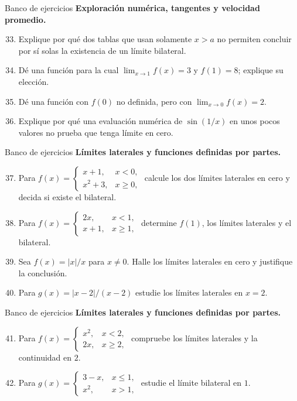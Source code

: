 \documentclass[12pt,aspectratio=169]{beamer}
\begin{document}
\begin{frame}[t,allowframebreaks]{Banco de ejercicios}
\small
\noindent \textbf{Exploración numérica, tangentes y velocidad promedio.}\par\smallskip
\begin{enumerate}\setcounter{enumi}{32}
\item Explique por qué dos tablas que usan solamente $x> a$ no permiten concluir por sí solas la existencia de un límite bilateral.
\item Dé una función para la cual $\lim_{x\to1}f(x)=3$ y $f(1)=8$; explique su elección.
\item Dé una función con $f(0)$ no definida, pero con $\lim_{x\to0}f(x)=2$.
\item Explique por qué una evaluación numérica de $\sin(1/x)$ en unos pocos valores no prueba que tenga límite en cero.
\end{enumerate}
\end{frame}


\begin{frame}[t,allowframebreaks]{Banco de ejercicios}
\small
\noindent \textbf{Límites laterales y funciones definidas por partes.}\par\smallskip
\begin{enumerate}\setcounter{enumi}{36}
\item Para $f(x)=\begin{cases}x+1,&x<0,\\x^2+3,&x\ge0,\end{cases}$ calcule los dos límites laterales en cero y decida si existe el bilateral.
\item Para $f(x)=\begin{cases}2x,&x<1,\\x+1,&x\ge1,\end{cases}$ determine $f(1)$, los límites laterales y el bilateral.
\item Sea $f(x)=|x|/x$ para $x\ne0$. Halle los límites laterales en cero y justifique la conclusión.
\item Para $g(x)=|x-2|/(x-2)$ estudie los límites laterales en $x=2$.
\end{enumerate}
\end{frame}


\begin{frame}[t,allowframebreaks]{Banco de ejercicios}
\small
\noindent \textbf{Límites laterales y funciones definidas por partes.}\par\smallskip
\begin{enumerate}\setcounter{enumi}{40}
\item Para $f(x)=\begin{cases}x^2,&x<2,\\2x,&x\ge2,\end{cases}$ compruebe los límites laterales y la continuidad en $2$.
\item Para $g(x)=\begin{cases}3-x,&x\le1,\\x^2,&x>1,\end{cases}$ estudie el límite bilateral en $1$.
\end{enumerate}
\end{frame}
\end{document}
